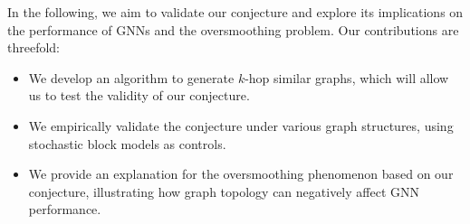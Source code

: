 In the following, we aim to validate our conjecture and explore its implications on the performance of GNNs and the oversmoothing problem. Our contributions are threefold:

\begin{itemize}
    \item We develop an algorithm to generate $k$-hop similar graphs, which will allow us to test the validity of our conjecture.
    \item We empirically validate the conjecture under various graph structures, using stochastic block models as controls.
    \item We provide an explanation for the oversmoothing phenomenon based on our conjecture, illustrating how graph topology can negatively affect GNN performance.
\end{itemize}

